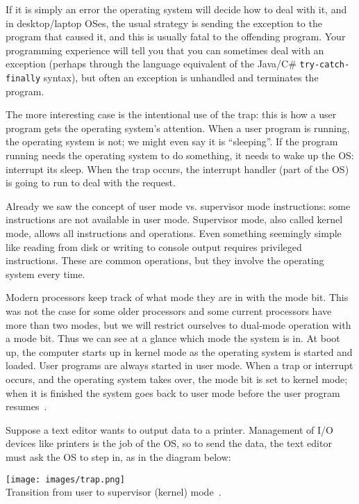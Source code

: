 If it is simply an error the operating system will decide how to deal with it, and in desktop/laptop OSes, the usual strategy is sending the exception to the program that caused it, and this is usually fatal to the offending program. Your programming experience will tell you that you can sometimes deal with an exception (perhaps through the language equivalent of the Java/C\# \texttt{try-catch-finally} syntax), but often an exception is unhandled and terminates the program.

The more interesting case is the intentional use of the trap: this is how a user program gets the operating system's attention. When a user program is running, the operating system is not; we might even say it is ``sleeping''. If the program running needs the operating system to do something, it needs to wake up the OS: interrupt its sleep. When the trap occurs, the interrupt handler (part of the OS) is going to run to deal with the request. 

Already we saw the concept of user mode vs. supervisor mode instructions: some instructions are not available in user mode. Supervisor mode, also called kernel mode, allows all instructions and operations. Even something seemingly simple like reading from disk or writing to console output requires privileged instructions. These are common operations, but they involve the operating system every time.

Modern processors keep track of what mode they are in with the mode bit. This was not the case for some older processors and some current processors have more than two modes, but we will restrict ourselves to dual-mode operation with a mode bit. Thus we can see at a glance which mode the system is in. At boot up, the computer starts up in kernel mode as the operating system is started and loaded. User programs are always started in user mode. When a trap or interrupt occurs, and the operating system takes over, the mode bit is set to kernel mode; when it is finished the system goes back to user mode before the user program resumes~\cite{osc}.

Suppose a text editor wants to output data to a printer. Management of I/O devices like printers is the job of the OS, so to send the data, the text editor must ask the OS to step in, as in the diagram below:

\begin{center}
	\texttt{[image: images/trap.png]}\\
	Transition from user to supervisor (kernel) mode~\cite{osc}.
\end{center}


